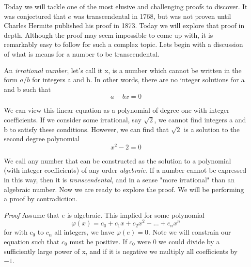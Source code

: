 \documentclass{article}
\begin{document}
Today we will tackle one of the most elusive and challenging proofs to discover. It was conjectured that $e$ was transcendental in 1768, but was not proven until Charles Hermite published his proof in 1873. Today we will explore that proof in depth. Although the proof may seem impossible to come up with, it is remarkably easy to follow for such a complex topic. Lets begin with a discussion of what is means for a number to be transcendental. 
\par
An \textit{irrational number}, let's call it x,  is a number which cannot be written in the form $a/b$ for integers a and b. In other words, there are no integer solutions for a and b such that
\begin{equation*}
    a-bx=0
\end{equation*}
\par
We can view this linear equation as a polynomial of degree one with integer coefficients. If we consider some irrational, say $\sqrt{2}$, we cannot find integers a and b to satisfy these conditions. However, we can find that $\sqrt{2}$ is a solution to the second degree polynomial 
\begin{equation*}
    x^2-2=0
\end{equation*}
\par
We call any number that can be constructed as the solution to a polynomial (with integer coefficients) of any order \textit{algebraic}. If a number cannot be expressed in this way, then it is \textit{transcendental}, and in a sense "more irrational" than an algebraic number. Now we are ready to explore the proof. We will be performing a proof by contradiction.
\par \par
\textit{Proof}
Assume that $e$ is algebraic. This implied for some polynomial 
\begin{equation*}
    \varphi(x)=c_0+c_1 x + c_2 x^2+...+c_n x^n
\end{equation*}
for with $c_0$ to $c_n$ all integers, we have $\varphi(e)=0$. Note we will constrain our equation such that $c_0$ must be positive. If $c_0$ were 0 we could divide by a sufficiently large power of x, and if it is negative we multiply all coefficients by $-1$. 
 
\end{document}
